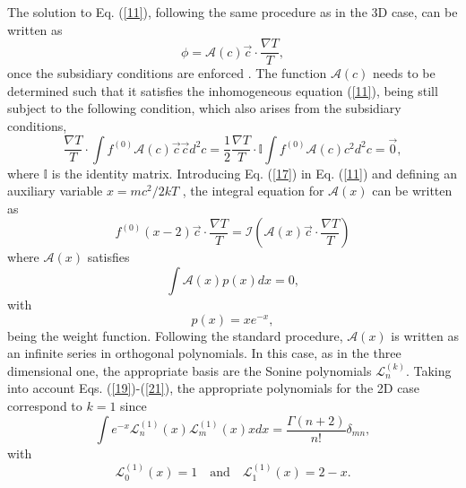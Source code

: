 \documentclass[11pt]{article} %
\begin{document}
The solution to Eq. (\ref{11}), following the same procedure as in
the 3D case, can be written as 
\begin{equation}
\phi=\mathcal{A}\left(c\right)\vec{c}\cdot\frac{\nabla T}{T},\label{17}
\end{equation}
once the subsidiary conditions are enforced \cite{Ch-E}. The function $\mathcal{A}\left(c\right)$
needs to be determined such that it satisfies the inhomogeneous equation
(\ref{11}), being still subject to the following condition, which
also arises from the subsidiary conditions, 
\begin{equation}
\frac{\nabla T}{T}\cdot\int f^{\left(0\right)}\mathcal{A}\left(c\right)\vec{c}\vec{c}d^{2}c=\frac{1}{2}\frac{\nabla T}{T}\cdot\mathbb{I}
\int f^{\left(0\right)}\mathcal{A}\left(c\right)c^{2}d^{2}c=\vec{0},\label{18}
\end{equation}
where $\mathbb{I}$ is the identity matrix. Introducing Eq. (\ref{17})
in Eq. (\ref{11}) and defining an auxiliary variable $x=mc^{2}/2kT$
, the integral equation for $\mathcal{A}\left(x\right)$ can be written
as 
\begin{equation}
f^{\left(0\right)}\left(x-2\right)\vec{c}\cdot\frac{\nabla T}{T}=\mathcal{I}\left(\mathcal{A}\left(x\right)\vec{c}\cdot\frac{\nabla T}{T}\right)\label{19}
\end{equation}
where $\mathcal{A}\left(x\right)$ satisfies 
\begin{equation}
\int\mathcal{A}\left(x\right)p\left(x\right)dx=0,\label{20}
\end{equation}
with 
\begin{equation}
p\left(x\right)=xe^{-x},\label{21}
\end{equation}
being the weight function. Following the standard procedure, $\mathcal{A}\left(x\right)$
is written as an infinite series in orthogonal polynomials. In this
case, as in the three dimensional one, the appropriate basis are the
Sonine polynomials $\mathcal{L}_{n}^{\left(k\right)}$. Taking into
account Eqs. (\ref{19})-(\ref{21}), the appropriate polynomials
for the 2D case correspond to $k=1$ since 
\begin{equation}
\int e^{-x}\mathcal{L}_{n}^{\left(1\right)}\left(x\right)\mathcal{L}_{m}^{\left(1\right)}\left(x\right)xdx=\frac{\Gamma\left(n+2\right)}{n!}\delta_{mn},\label{22}
\end{equation}
with 
\begin{equation}
\mathcal{L}_{0}^{\left(1\right)}\left(x\right)=1\quad\text{and}\quad\mathcal{L}_{1}^{\left(1\right)}\left(x\right)=2-x.\label{23}
\end{equation}
\end{document}
